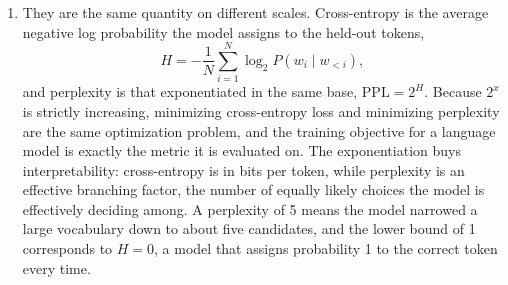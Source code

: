 \documentclass[11pt]{article}
\begin{document}
\begin{enumerate}
        The grammatical information in the previous word or two is mostly \emph{local syntactic}
        information: part-of-speech transition probabilities (a determiner is followed by a noun or
        adjective, not a finite verb), agreement with an adjacent head, subcategorization of the immediately
        preceding preposition or auxiliary, and morphological continuation within a sub-word sequence. What
        they do not capture is anything requiring structure over the whole sentence. The lecture's own
        numbers show both sides: on Wall Street Journal text perplexity falls from roughly 1000 for a
        unigram model to 170 for a bigram and 109 for a trigram, so almost all of the gain comes from the
        first one or two words of context, and then the curve saturates because sparsity sets in.

  \item They are the same quantity on different scales. Cross-entropy is the average negative log
        probability the model assigns to the held-out tokens,
        \[
          H = -\frac{1}{N}\sum_{i=1}^{N} \log_2 P(w_i \mid w_{<i}),
        \]
        and perplexity is that exponentiated in the same base, $\mathrm{PPL} = 2^{H}$. Because $2^x$ is
        strictly increasing, minimizing cross-entropy loss and minimizing perplexity are the same
        optimization problem, and the training objective for a language model is exactly the metric it is
        evaluated on. The exponentiation buys interpretability: cross-entropy is in bits per token, while
        perplexity is an effective branching factor, the number of equally likely choices the model is
        effectively deciding among. A perplexity of 5 means the model narrowed a large vocabulary down to
        about five candidates, and the lower bound of 1 corresponds to $H = 0$, a model that assigns
        probability 1 to the correct token every time.


\end{enumerate}
\end{document}
